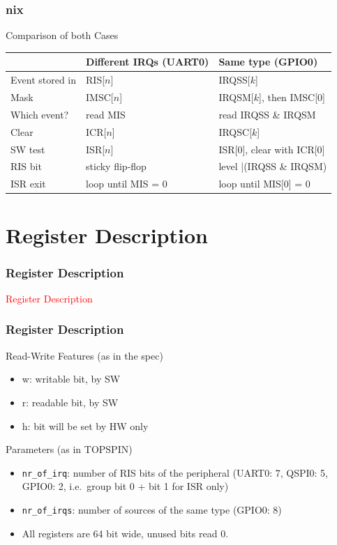 \documentclass{beamer}
\newcommand{\astitle}{nix}
\newcommand{\assubtitle}{nix}
\newcommand{\cmd}[1]{\texttt{#1}}
\begin{document}
\renewcommand{\assubtitle}{Comparison of both Cases}
\begin{frame}
\frametitle{\astitle}
\begin{block}{\assubtitle}
{\scriptsize
\begin{tabularx}{\textwidth}{|l|Y|Y|}
  \hline
   & \textbf{Different IRQs (UART0)} & \textbf{Same type (GPIO0)} \\
  \hline
  \hline
  Event stored in & RIS[$n$] & IRQSS[$k$] \\
  \hline
  Mask & IMSC[$n$] & IRQSM[$k$], then IMSC[0] \\
  \hline
  Which event? & read MIS & read IRQSS \& IRQSM \\
  \hline
  Clear & ICR[$n$] & IRQSC[$k$] \\
  \hline
  SW test & ISR[$n$] & ISR[0], clear with ICR[0] \\
  \hline
  RIS bit & sticky flip-flop & level |(IRQSS \& IRQSM) \\
  \hline
  ISR exit & loop until MIS = 0 & loop until MIS[0] = 0 \\
  \hline
\end{tabularx}}
\end{block}
\end{frame}

\section{Register Description}
\renewcommand{\astitle}{Register Description}
\begin{frame}
\frametitle{\astitle}
\textcolor{red}{Register Description}
\end{frame}

\renewcommand{\assubtitle}{Conventions}
\begin{frame}
\frametitle{\astitle}
\begin{block}{Read-Write Features (as in the spec)}
  \begin{itemize}
    \item w: writable bit, by SW
    \item r: readable bit, by SW
    \item h: bit will be set by HW only
  \end{itemize}
\end{block}
\begin{block}{Parameters (as in TOPSPIN)}
  \begin{itemize}
    \item \cmd{nr\_of\_irq}: number of RIS bits of the peripheral
      (UART0: 7, QSPI0: 5, GPIO0: 2, i.e.\ group bit 0 + bit 1 for ISR only)
    \item \cmd{nr\_of\_irqs}: number of sources of the same type (GPIO0: 8)
    \item All registers are 64 bit wide, unused bits read 0.
  \end{itemize}
\end{block}
\end{frame}
\end{document}
